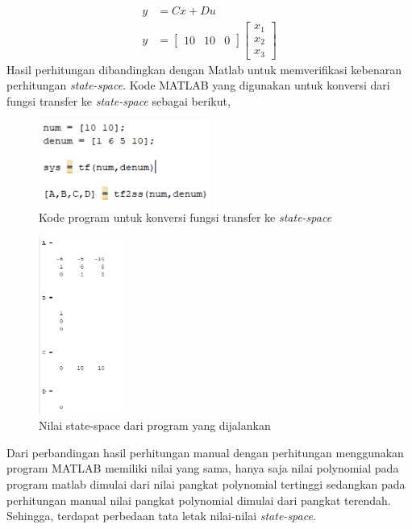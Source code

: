 \documentclass[../cover.tex]{subfiles}
\begin{document}
            \begin{equation}
                \begin{split}
                    y &= Cx + Du \\[5pt]
                    y &= \begin{bmatrix} 10 & 10 & 0\end{bmatrix} \begin{bmatrix} x_1 \\ x_2 \\ x_3 \end{bmatrix}
                \end{split}
            \end{equation}
            Hasil perhitungan dibandingkan dengan Matlab untuk memverifikasi kebenaran perhitungan \textit{state-space}. Kode MATLAB yang digunakan untuk konversi dari fungsi transfer ke \textit{state-space} sebagai berikut,
            \begin{figure}[H]
                \centering
                \includegraphics[width = 0.5\textwidth]{assets/image/kodeMatlab.png}
                \caption{Kode program untuk konversi fungsi transfer ke \textit{state-space}}
                \label{gambar_4}
            \end{figure}
            \begin{figure}[H]
                \centering
                \includegraphics[width = 0.25\textwidth]{assets/image/outSSMatlab.png}
                \caption{Nilai state-space dari program yang dijalankan}
                \label{gambar_5}
            \end{figure}
            Dari perbandingan hasil perhitungan manual dengan perhitungan menggunakan program MATLAB memiliki nilai yang sama, hanya saja nilai polynomial pada program matlab dimulai dari nilai pangkat polynomial tertinggi sedangkan pada perhitungan manual nilai pangkat polynomial dimulai dari pangkat terendah. Sehingga, terdapat perbedaan tata letak nilai-nilai \textit{state-space}.
\end{document}
